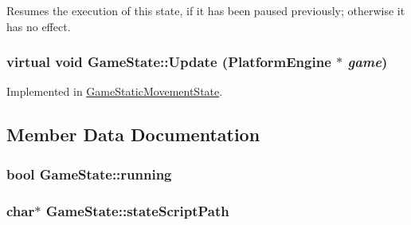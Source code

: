 Resumes the execution of this state, if it has been paused previously; otherwise it has no effect. \hypertarget{class_game_state_100ca49bc95afce1d5c5b756708bbc2b}{
\subsubsection[{Update}]{\setlength{\rightskip}{0pt plus 5cm}virtual void GameState::Update ({\bf PlatformEngine} $\ast$ {\em game})}}
\label{dd/d87/class_game_state_100ca49bc95afce1d5c5b756708bbc2b}




Implemented in \hyperlink{class_game_static_movement_state_5a3bd910a85487be371c088a1be16996}{GameStaticMovementState}.

\subsection{Member Data Documentation}
\hypertarget{class_game_state_391df04a740c7480270d3c71a578b43a}{
\subsubsection[{running}]{\setlength{\rightskip}{0pt plus 5cm}bool {\bf GameState::running}}}
\label{dd/d87/class_game_state_391df04a740c7480270d3c71a578b43a}


\hypertarget{class_game_state_bfe09abe78dd5794426964d3392b2973}{
\subsubsection[{stateScriptPath}]{\setlength{\rightskip}{0pt plus 5cm}char$\ast$ {\bf GameState::stateScriptPath}}}
\label{dd/d87/class_game_state_bfe09abe78dd5794426964d3392b2973}


